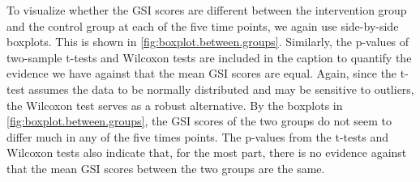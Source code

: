 \noindent To visualize whether the GSI scores are different between the intervention group and the control group at each of the five time points, we again use side-by-side boxplots. This is shown in \cref{fig:boxplot.between.groups}. Similarly, the p-values of two-sample t-tests and Wilcoxon tests are included in the caption to quantify the evidence we have against that the mean GSI scores are equal. Again, since the t-test assumes the data to be normally distributed and may be sensitive to outliers, the Wilcoxon test serves as a robust alternative. By the boxplots in \cref{fig:boxplot.between.groups}, the GSI scores of the two groups do not seem to differ much in any of the five times points. The p-values from the t-tests and Wilcoxon tests also indicate that, for the most part, there is no evidence against that the mean GSI scores between the two groups are the same.
